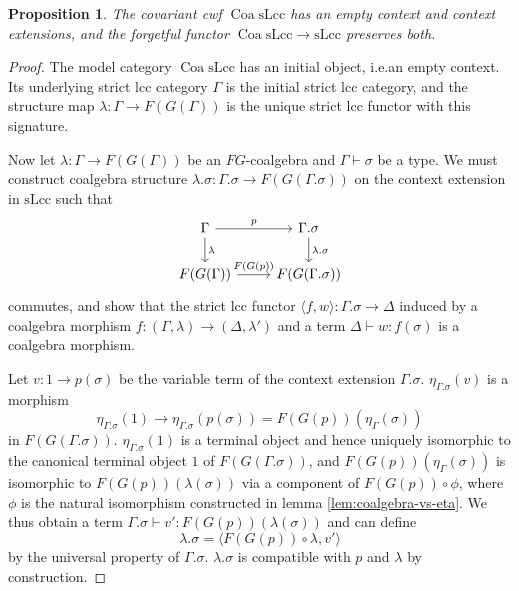 \documentclass[a4paper]{article}
\newtheorem{proposition}[theorem]{Proposition}
\theoremstyle{remark}
\theoremstyle{definition}
\begin{document}
\begin{proposition}
  \label{prop:coa-slcc-exts}
  The covariant cwf $\operatorname{Coa} \mathrm{sLcc}$ has an empty context and context extensions, and the forgetful functor $\operatorname{Coa} \mathrm{sLcc} \rightarrow \mathrm{sLcc}$ preserves both.
\end{proposition}
\begin{proof}
  The model category $\operatorname{Coa} \mathrm{sLcc}$ has an initial object, i.e.\@ an empty context.
  Its underlying strict lcc category $\Gamma$ is the initial strict lcc category, and the structure map $\lambda : \Gamma \rightarrow F(G(\Gamma))$ is the unique strict lcc functor with this signature.

  Now let $\lambda : \Gamma \rightarrow F(G(\Gamma))$ be an $FG$-coalgebra and $\Gamma \vdash \sigma$ be a type.
  We must construct coalgebra structure $\lambda.\sigma : \Gamma.\sigma \rightarrow F(G(\Gamma.\sigma))$ on the context extension in $\mathrm{sLcc}$ such that
  \begin{equation}
    \begin{tikzcd}
      \Gamma \arrow[r, "p"] \arrow[d, "\lambda"] & \Gamma.\sigma \arrow[d, "\lambda.\sigma"] \\
      F(G(\Gamma)) \arrow[r, "F(G(p))"] & F(G(\Gamma.\sigma))
    \end{tikzcd}
  \end{equation}
  commutes, and show that the strict lcc functor $\langle f, w \rangle : \Gamma.\sigma \rightarrow \Delta$ induced by a coalgebra morphism $f : (\Gamma, \lambda) \rightarrow (\Delta, \lambda')$ and a term $\Delta \vdash w : f(\sigma)$ is a coalgebra morphism.

  Let $v : 1 \rightarrow p(\sigma)$ be the variable term of the context extension $\Gamma.\sigma$.
  $\eta_{\Gamma.\sigma}(v)$ is a morphism
  \begin{equation}
    \eta_{\Gamma.\sigma}(1) \rightarrow \eta_{\Gamma.\sigma}(p(\sigma)) = F(G(p))(\eta_\Gamma(\sigma))
  \end{equation}
  in $F(G(\Gamma.\sigma))$.
  $\eta_{\Gamma.\sigma}(1)$ is a terminal object and hence uniquely isomorphic to the canonical terminal object $1$ of $F(G(\Gamma.\sigma))$, and $F(G(p))(\eta_\Gamma(\sigma))$ is isomorphic to $F(G(p))(\lambda(\sigma))$ via a component of $F(G(p)) \circ \phi$, where $\phi$ is the natural isomorphism constructed in lemma \ref{lem:coalgebra-vs-eta}.
  We thus obtain a term $\Gamma.\sigma \vdash v' : F(G(p))(\lambda(\sigma))$ and can define
  \begin{equation}
    \lambda.\sigma = \langle F(G(p)) \circ \lambda, v' \rangle
  \end{equation}
  by the universal property of $\Gamma.\sigma$.
  $\lambda.\sigma$ is compatible with $p$ and $\lambda$ by construction.


\end{proof}
\end{document}
